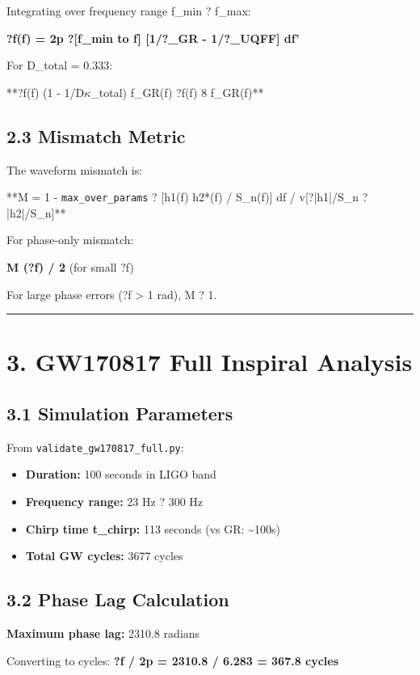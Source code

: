 \documentclass[11pt]{article}
\begin{document}
Integrating over frequency range f\_min ? f\_max:

\textbf{?f(f) = 2p ?[f\_min to f] [1/?\_GR - 1/?\_UQFF] df'}

For D\_total = 0.333:

**?f(f)  (1 - 1/D$\kappa$\_total)  f\_GR(f)\textbf{ }?f(f)  8  f\_GR(f)**

\subsection*{2.3 Mismatch Metric}

The waveform mismatch is:

**M = 1 - \verb|max_over_params| ? [h1(f) h2*(f) / S\_n(f)] df / v[?|h1|/S\_n ?|h2|/S\_n]**

For phase-only mismatch:

\textbf{M  (?f) / 2} (for small ?f)

For large phase errors (?f > 1 rad), M ? 1.

\noindent\rule{\textwidth}{0.4pt}

\section*{3. GW170817 Full Inspiral Analysis}

\subsection*{3.1 Simulation Parameters}

From \verb|validate_gw170817_full.py|:

\begin{itemize}
  \item \textbf{Duration:} 100 seconds in LIGO band
  \item \textbf{Frequency range:} 23 Hz ? 300 Hz
  \item \textbf{Chirp time t\_chirp:} 113 seconds (vs GR: \textasciitilde{}100s)
  \item \textbf{Total GW cycles:} 3677 cycles
\end{itemize}

\subsection*{3.2 Phase Lag Calculation}

\textbf{Maximum phase lag:} 2310.8 radians

Converting to cycles: \textbf{?f / 2p = 2310.8 / 6.283 = 367.8 cycles}
\end{document}
